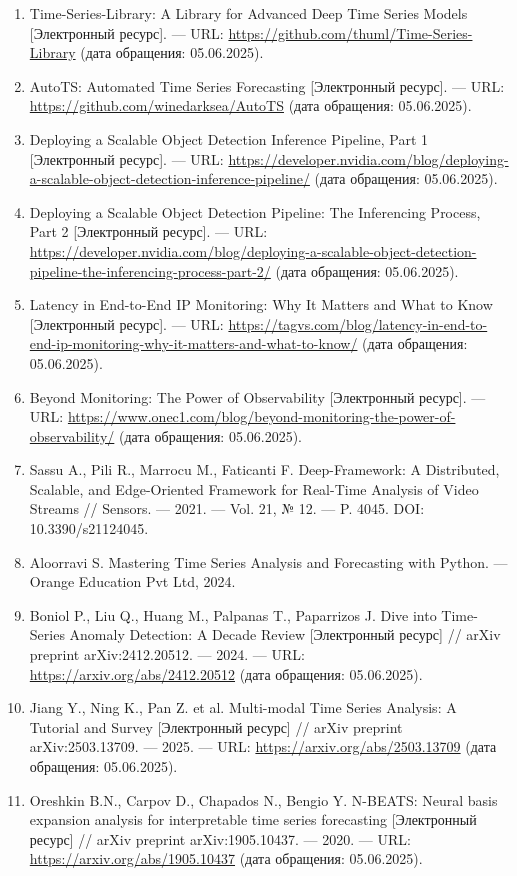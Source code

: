 \begin{enumerate}[label=\arabic*)\hspace{1em}, leftmargin=1cm, itemsep=0em]
	\item Time-Series-Library: A Library for Advanced Deep Time Series Models [Электронный ресурс]. — URL: \url{https://github.com/thuml/Time-Series-Library} (дата обращения: 05.06.2025).
	\item AutoTS: Automated Time Series Forecasting [Электронный ресурс]. — URL: \url{https://github.com/winedarksea/AutoTS} (дата обращения: 05.06.2025).
	\item Deploying a Scalable Object Detection Inference Pipeline, Part 1 [Электронный ресурс]. — URL: \url{https://developer.nvidia.com/blog/deploying-a-scalable-object-detection-inference-pipeline/} (дата обращения: 05.06.2025).
	\item Deploying a Scalable Object Detection Pipeline: The Inferencing Process, Part 2 [Электронный ресурс]. — URL: \url{https://developer.nvidia.com/blog/deploying-a-scalable-object-detection-pipeline-the-inferencing-process-part-2/} (дата обращения: 05.06.2025).
	\item Latency in End-to-End IP Monitoring: Why It Matters and What to Know [Электронный ресурс]. — URL: \url{https://tagvs.com/blog/latency-in-end-to-end-ip-monitoring-why-it-matters-and-what-to-know/} (дата обращения: 05.06.2025).
	\item Beyond Monitoring: The Power of Observability [Электронный ресурс]. — URL: \url{https://www.onec1.com/blog/beyond-monitoring-the-power-of-observability/} (дата обращения: 05.06.2025).
	\item Sassu A., Pili R., Marrocu M., Faticanti F. Deep-Framework: A Distributed, Scalable, and Edge-Oriented Framework for Real-Time Analysis of Video Streams // Sensors. — 2021. — Vol. 21, № 12. — P. 4045. DOI: 10.3390/s21124045.
	\item Aloorravi S. Mastering Time Series Analysis and Forecasting with Python. — Orange Education Pvt Ltd, 2024.
	\item Boniol P., Liu Q., Huang M., Palpanas T., Paparrizos J. Dive into Time-Series Anomaly Detection: A Decade Review [Электронный ресурс] // arXiv preprint arXiv:2412.20512. — 2024. — URL: \url{https://arxiv.org/abs/2412.20512} (дата обращения: 05.06.2025).
	\item Jiang Y., Ning K., Pan Z. et al. Multi-modal Time Series Analysis: A Tutorial and Survey [Электронный ресурс] // arXiv preprint arXiv:2503.13709. — 2025. — URL: \url{https://arxiv.org/abs/2503.13709} (дата обращения: 05.06.2025).
	\item Oreshkin B.N., Carpov D., Chapados N., Bengio Y. N-BEATS: Neural basis expansion analysis for interpretable time series forecasting [Электронный ресурс] // arXiv preprint arXiv:1905.10437. — 2020. — URL: \url{https://arxiv.org/abs/1905.10437} (дата обращения: 05.06.2025).
\end{enumerate}